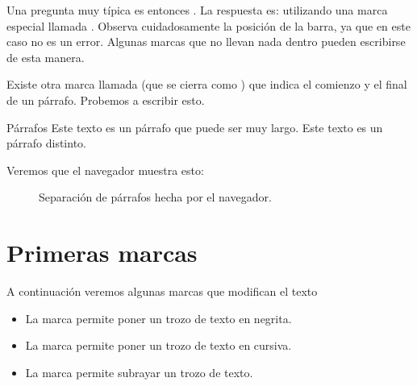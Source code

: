\documentclass[a4paper,12pt,spanish]{sphinxmanual}
\begin{document}
Una pregunta muy típica es entonces . La respuesta es: utilizando una marca especial llamada . Observa cuidadosamente la posición de la barra, ya que en este caso no es un error. Algunas marcas que no llevan nada dentro pueden escribirse de esta manera.

Existe otra marca llamada  (que se cierra como ) que indica el comienzo y el final de un párrafo. Probemos a escribir esto.

%
\begin{sphinxVerbatim}[commandchars=\\\{\}]
      Párrafos  
      Este texto es un párrafo que puede ser muy largo. 
      Este texto es un párrafo distinto. 
\end{sphinxVerbatim}

Veremos que el navegador muestra esto:

\begin{figure}[htbp]
\centering
\capstart

\noindent{}
\caption{Separación de párrafos hecha por el navegador.}\label{\detokenize{index:id12}}\end{figure}


\chapter{Primeras marcas}
\label{\detokenize{index:primeras-marcas}}
A continuación veremos algunas marcas que modifican el texto
\begin{itemize}
\item {} 
La marca  permite poner un trozo de texto en negrita.

\item {} 
La marca  permite poner un trozo de texto en cursiva.

\item {} 
La marca  permite subrayar un trozo de texto.

\end{itemize}
\end{document}
